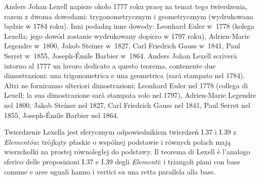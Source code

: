 Anders Johan Lexell napisze około 1777 roku pracę na temat tego twierdzenia, razem z dwoma dowodami: trygonometrycznym i geometrycznym (wydrukowana będzie w 1784 roku). %
Inni podadzą inne dowody: %
Leonhard Euler w~1778 (kolega Lexella; jego dowód zostanie wydrukowany dopiero w 1797 roku), %
Adrien-Marie Legendre w~1800, %
Jakob Steiner w~1827, %
Carl Friedrich Gauss w~1841, %
Paul Serret w~1855, %
Joseph-Émile Barbier w~1864. %
Anders Johan Lexell scriverà intorno al 1777 un lavoro dedicato a questo teorema, contenente due dimostrazioni: una trigonometrica e una geometrica (sarà stampato nel 1784). %
Altri ne forniranno ulteriori dimostrazioni: %
Leonhard Euler nel 1778 (collega di Lexell; la sua dimostrazione sarà stampata solo nel 1797), %
Adrien-Marie Legendre nel 1800, %
Jakob Steiner nel 1827, %
Carl Friedrich Gauss nel 1841, %
Paul Serret nel 1855, %
Joseph-Émile Barbier nel 1864. %
%
%
%
%

Twierdzenie Lexella jest sferycznym odpowiednikiem twierdzeń I.37 i I.39 z \emph{Elementów}: trójkąty płaskie o wspólnej podstawie i równych polach mają wierzchołki na prostej równoległej do podstawy. %
Il teorema di Lexell è l'analogo sferico delle proposizioni I.37 e I.39 degli \emph{Elementi}: i triangoli piani con base comune e aree uguali hanno i vertici su una retta parallela alla base. %


